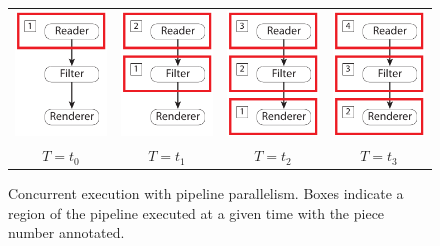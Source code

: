 \documentclass[journal,onecolumn,12pt,letterpaper,twoside]{IEEEtran}
\begin{document}
\begin{figure}[htbp]
  \centering
  \begin{tabular}{@{}c@{\qquad}c@{\qquad}c@{\qquad}c@{}}
    \includegraphics[scale=1]{images/PipelineParallel0} &
    \includegraphics[scale=1]{images/PipelineParallel1} &
    \includegraphics[scale=1]{images/PipelineParallel2} &
    \includegraphics[scale=1]{images/PipelineParallel3} \\
    $T = t_0$ & $T = t_1$ & $T = t_2$ & $T= t_3$
  \end{tabular}
  \caption{Concurrent execution with pipeline parallelism.  Boxes indicate
    a region of the pipeline executed at a given time with the piece number
    annotated.}
  \label{fig:PipelineParallelism}
\end{figure}
\end{document}

